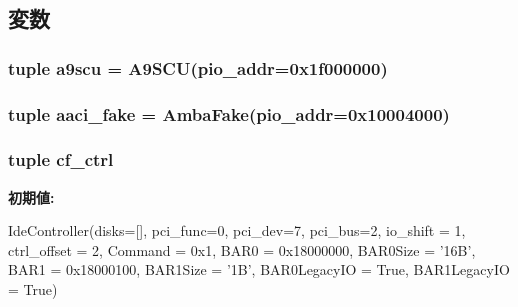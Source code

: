 \subsection{変数}
\hypertarget{classRealView_1_1RealViewPBX_a3f890ed84673729b115e1a537a6bf122}{
\subsubsection[{a9scu}]{\setlength{\rightskip}{0pt plus 5cm}tuple {\bf a9scu} = {\bf A9SCU}(pio\_\-addr=0x1f000000)}}
\label{classRealView_1_1RealViewPBX_a3f890ed84673729b115e1a537a6bf122}
\hypertarget{classRealView_1_1RealViewPBX_a40e0278b62fc0e814579ee52118d2e2a}{
\subsubsection[{aaci\_\-fake}]{\setlength{\rightskip}{0pt plus 5cm}tuple {\bf aaci\_\-fake} = {\bf AmbaFake}(pio\_\-addr=0x10004000)}}
\label{classRealView_1_1RealViewPBX_a40e0278b62fc0e814579ee52118d2e2a}
\hypertarget{classRealView_1_1RealViewPBX_a3e7e22e24895378aafbb1c7b707248ae}{
\subsubsection[{cf\_\-ctrl}]{\setlength{\rightskip}{0pt plus 5cm}tuple {\bf cf\_\-ctrl}}}
\label{classRealView_1_1RealViewPBX_a3e7e22e24895378aafbb1c7b707248ae}
{\bfseries 初期値:}
\begin{DoxyCode}
IdeController(disks=[], pci_func=0, pci_dev=7, pci_bus=2,
                            io_shift = 1, ctrl_offset = 2, Command = 0x1,
                            BAR0 = 0x18000000, BAR0Size = '16B',
                            BAR1 = 0x18000100, BAR1Size = '1B',
                            BAR0LegacyIO = True, BAR1LegacyIO = True)
\end{DoxyCode}
